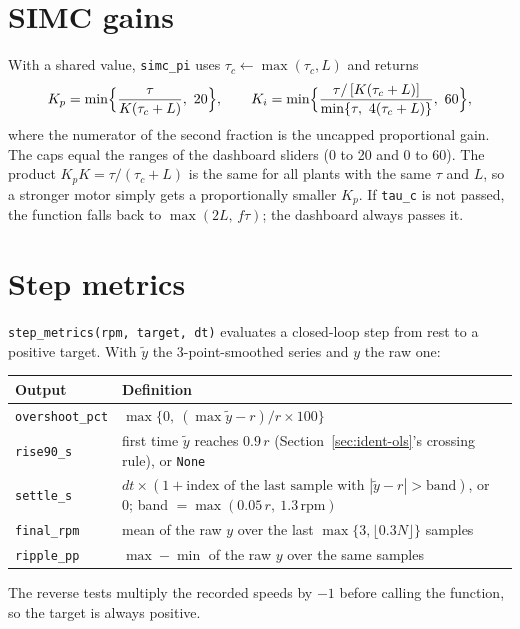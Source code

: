 \documentclass[11pt,a4paper]{report}
\newcommand{\code}[1]{\texttt{#1}}
\newcommand{\rpm}{\,\mathrm{rpm}}
\begin{document}
\section{SIMC gains}\label{sec:simcpi}
With a shared value, \code{simc\_pi} uses $\tau_c\leftarrow\max(\tau_c,L)$ and returns
\begin{equation}
  K_p=\min\Bigl\{\frac{\tau}{K(\tau_c+L)},\ 20\Bigr\},\qquad
  K_i=\min\Bigl\{\frac{\tau/\,[K(\tau_c+L)]}{\min\{\tau,\ 4(\tau_c+L)\}},\ 60\Bigr\},
\end{equation}
where the numerator of the second fraction is the uncapped proportional gain. The caps equal the ranges of the dashboard sliders (0 to 20 and 0 to 60). The product $K_pK=\tau/(\tau_c+L)$ is the same for all plants with the same $\tau$ and $L$, so a stronger motor simply gets a proportionally smaller $K_p$. If \code{tau\_c} is not passed, the function falls back to $\max(2L,\,f\tau)$; the dashboard always passes it.

\section{Step metrics}\label{sec:stepmetrics}
\code{step\_metrics(rpm, target, dt)} evaluates a closed-loop step from rest to a positive target. With $\tilde y$ the 3-point-smoothed series and $y$ the raw one:
\begin{center}
\small
\begin{tabular}{@{}lp{9.6cm}@{}}
\toprule
Output & Definition\\
\midrule
\code{overshoot\_pct} & $\max\{0,\ (\max\tilde y-r)/r\times100\}$\\
\code{rise90\_s} & first time $\tilde y$ reaches $0.9\,r$ (Section~\ref{sec:ident-ols}'s crossing rule), or \code{None}\\
\code{settle\_s} & $dt\times(1+\text{index of the last sample with } |\tilde y-r|>\text{band})$, or 0; band $=\max(0.05\,r,\ 1.3\rpm)$\\
\code{final\_rpm} & mean of the raw $y$ over the last $\max\{3,\lfloor0.3N\rfloor\}$ samples\\
\code{ripple\_pp} & $\max-\min$ of the raw $y$ over the same samples\\
\bottomrule
\end{tabular}
\end{center}
The reverse tests multiply the recorded speeds by $-1$ before calling the function, so the target is always positive.
\end{document}
